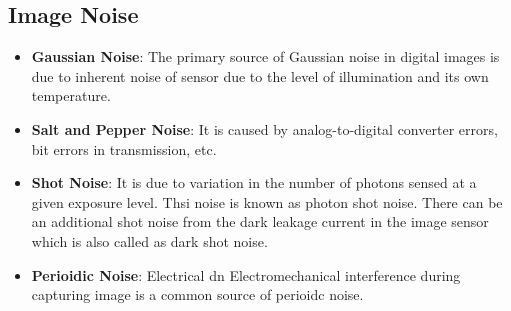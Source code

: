 \documentclass[10pt,twocolumn,letterpaper]{article}
\begin{document}
\subsection{Image Noise}

\begin{itemize}
\setlength\itemsep{0.1em}
\item \textbf{Gaussian Noise}: The primary source of Gaussian noise in digital images is due to inherent noise of sensor due to the level of illumination and its own temperature.\cite{enwiki:1057073251}
\item \textbf{Salt and Pepper Noise}: It is caused by  analog-to-digital converter errors, bit errors in transmission, etc.\cite{enwiki:1057073251}
\item \textbf{Shot Noise}: It is due to variation in the number of photons sensed at a given exposure level. Thsi noise is known as photon shot noise. There can be an additional shot noise from the dark leakage current in the image sensor which is also called as dark shot noise.\cite{enwiki:1057073251}
\item \textbf{Perioidic Noise}: Electrical dn Electromechanical interference during capturing image is a common source of perioidc noise.\cite{enwiki:1057073251}
\end{itemize}
\end{document}
